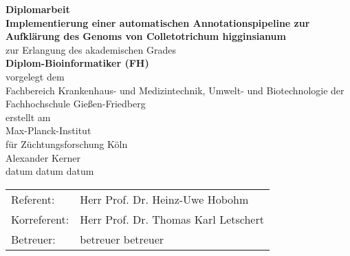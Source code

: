 \begin{titlepage}
	\begin{center}
\huge \textbf{Diplomarbeit}
\\
\vspace{1.0cm}
\large \textbf{Implementierung einer automatischen Annotationspipeline
zur Aufklärung des Genoms von Colletotrichum higginsianum}
\\
\vspace{1.0cm}
\large zur Erlangung des akademischen Grades
\\
\vspace{1.0cm}
\LARGE \textbf{Diplom-Bioinformatiker (FH)}
\\
\vspace{1.0cm} 
\normalsize vorgelegt dem
\\
\normalsize Fachbereich Krankenhaus- und Medizintechnik, Umwelt- und
Biotechnologie der Fachhochschule Gießen-Friedberg
\\
\vspace{1.0cm}
\normalsize erstellt am
\\
Max-Planck-Institut
\\
für Züchtungsforschung Köln
\\
\vspace{1.0cm}
\normalsize Alexander Kerner
\\
\vspace{1.0cm}
\normalsize datum datum datum
\\
\vspace{1.0cm}
\begin{table}[h]
	\begin{center}
	\begin{tabular}{ll}
		Referent: & Herr Prof. Dr. Heinz-Uwe Hobohm \\
		Korreferent: & Herr Prof. Dr. Thomas Karl Letschert \\
		Betreuer: & betreuer betreuer
	\end{tabular}
\end{center}
\end{table}
\end{center}
\end{titlepage}